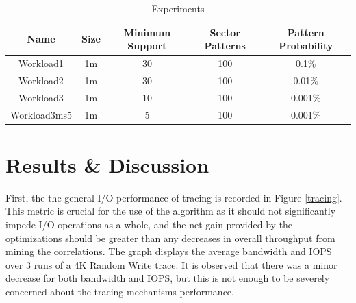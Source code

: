 \documentclass[MEng]{uofl}
\begin{document}
\begin{table}
    \caption{Experiments}
    \begin{center}
    \begin{tabular}{|c|c|c|c|c|} \hline
    Name&Size&Minimum Support&Sector Patterns&Pattern Probability \\ \hline
    Workload1 & 1m & 30 & 100 & 0.1\% \\ \hline
    Workload2 & 1m & 30 & 100 & 0.01\% \\ \hline
    Workload3 & 1m & 10 & 100 & 0.001\% \\ \hline
    Workload3ms5 & 1m & 5 & 100 & 0.001\% \\ \hline
    \end{tabular}
    \end{center}
    \label{tab:a}
\end{table}

\chapter{Results \& Discussion}
First, the the general I/O performance of tracing is recorded in Figure \ref{tracing}. This metric is crucial for the use of the algorithm as it should not significantly impede I/O operations as a whole, and the net gain provided by the optimizations should be greater than any decreases in overall throughput from mining the correlations. The graph displays the average bandwidth and IOPS over 3 runs of a 4K Random Write trace. It is observed that there was a minor decrease for both bandwidth and IOPS, but this is not enough to be severely concerned about the tracing mechanisms performance. 
\end{document}
